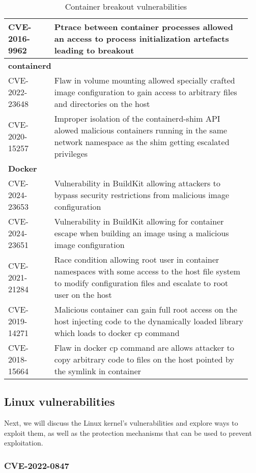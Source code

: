 \begin{table}[hbt]
\begin{tabular}{| p{0.18\linewidth} | p{0.77\linewidth} |}
        CVE-2016-9962 & Ptrace between container processes allowed an access to process initialization artefacts leading to breakout \\ \hline
        \multicolumn{2}{|l|}{\textbf{containerd}} \\ \hline
        CVE-2022-23648 & Flaw in volume mounting allowed specially crafted image configuration to gain access to arbitrary files and directories on the host \\ \hline
        CVE-2020-15257 & Improper isolation of the containerd-shim API alowed malicious containers running in the same network namespace as the shim getting escalated privileges \\ \hline
        \multicolumn{2}{|l|}{\textbf{Docker}} \\ \hline
        CVE-2024-23653 & Vulnerability in BuildKit allowing attackers to bypass security restrictions from malicious image configuration \\ \hline
        CVE-2024-23651 & Vulnerability in BuildKit allowing for container escape when building an image using a malicious image configuration \\ \hline
        CVE-2021-21284 & Race condition allowing root user in container namespaces with some access to the host file system to modify configuration files and escalate to root user on the host \\ \hline
        CVE-2019-14271 & Malicious container can gain full root access on the host injecting code to the dynamically loaded library which loads to docker cp command \\ \hline
        CVE-2018-15664 & Flaw in docker cp command are allows attacker to copy arbitrary code to files on the host pointed by the symlink in container \\ \hline
    \end{tabular}
    \caption{Container breakout vulnerabilities}
    \label{tab:escapecve}
\end{table}

\FloatBarrier
\clearpage


\subsection{Linux vulnerabilities}
Next, we will discuss the Linux kernel's vulnerabilities and explore ways to exploit them, as well as the protection mechanisms that can be used to prevent exploitation.

\subsubsection{CVE-2022-0847}

